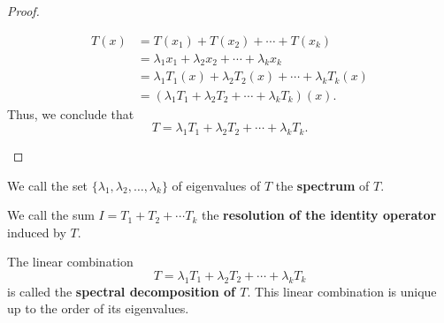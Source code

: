 \begin{proof}
\begin{enumerate}
\begin{align*}
            T(x) &= T({x}_{1}) + T({x}_{2}) + \cdots + T({x}_{k}) \\
                 &= {\lambda}_{1} {x}_{1} + {\lambda}_{2} {x}_{2} + \cdots + {\lambda}_{k} {x}_{k} \\ 
                 &= {\lambda}_{1} {T}_{1}(x) + {\lambda}_{2} {T}_{2}(x) + \cdots + {\lambda}_{k} {T}_{k}(x) \\
                 &=  ({\lambda}_{1} {T}_{1} + {\lambda}_{2} {T}_{2} + \cdots + {\lambda}_{k} {T}_{k } )(x).
        \end{align*}
        Thus, we conclude that 
        \[  T = {\lambda}_{1} {T}_{1} + {\lambda}_{2} {T}_{2} + \cdots + {\lambda}_{k} {T}_{k}. \]
     \end{enumerate}
\end{proof}

\begin{definition}[Spectrum of \(T\)]
    We call the set \( \{ {\lambda}_{1}, {\lambda}_{2}, \dots, {\lambda}_{k} \}  \) of eigenvalues of \( T  \) the \textbf{spectrum} of \( T  \).
\end{definition}

\begin{definition}
   We call the sum \( I = {T}_{1} + {T}_{2} + \cdots {T}_{k} \) the \textbf{resolution of the identity operator} induced by \( T  \). 
\end{definition}

\begin{definition}
    The linear combination 
    \[  T = {\lambda}_{1} {T}_{1} + {\lambda}_{2} {T}_{2} + \cdots + {\lambda}_{k} {T}_{k} \]
    is called the \textbf{spectral decomposition of \( T  \)}. This linear combination is unique up to the order of its eigenvalues.
\end{definition}

